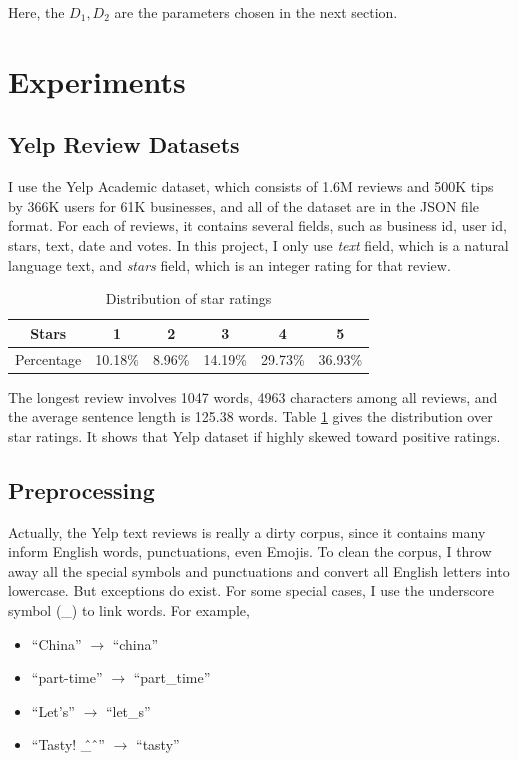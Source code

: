 \documentclass[11pt]{article}
\theoremstyle{definition}
\theoremstyle{basic}
\begin{document}
Here, the $D_1, D_2$ are the parameters chosen in the next section.



\section{Experiments}

\subsection{Yelp Review Datasets}

I use the Yelp Academic dataset, which consists of 1.6M reviews and 500K tips by 366K users for 61K businesses, and all of the dataset are in the JSON file format.
For each of reviews, it contains several fields, such as business id, user id, stars, text, date and votes.
In this project, I only use \textit{text} field, which is a natural language text, and \textit{stars} field, which is an integer rating for that review.


\begin{table}
\centering
\begin{tabular}{c|c|c|c|c|c}
Stars & 1 & 2 & 3 & 4 & 5\\\hline
Percentage & 10.18\% & 8.96\% & 14.19\% & 29.73\% & 36.93\%
\end{tabular}
\caption{Distribution of star ratings}
\label{table0}
\end{table}

The longest review involves 1047 words, 4963 characters among all reviews, and the average sentence length is 125.38 words.
Table \ref{table0} gives the distribution over star ratings.
It shows that Yelp dataset if highly skewed toward positive ratings.


\subsection{Preprocessing}

Actually, the Yelp text reviews is really a dirty corpus, since it contains many inform English words, punctuations, even Emojis.
To clean the corpus, I throw away all the special symbols and punctuations and convert all English letters into lowercase.
But exceptions do exist.
For some special cases, I use the underscore symbol (\_) to link words.
For example,
\begin{itemize}
    \item ``China'' $\rightarrow$ ``china''
    \item ``part-time'' $\rightarrow$ ``part\_time''
    \item ``Let's'' $\rightarrow$ ``let\_s''
    \item ``Tasty! \^\_\^\ '' $\rightarrow$ ``tasty''
\end{itemize}
\end{document}
